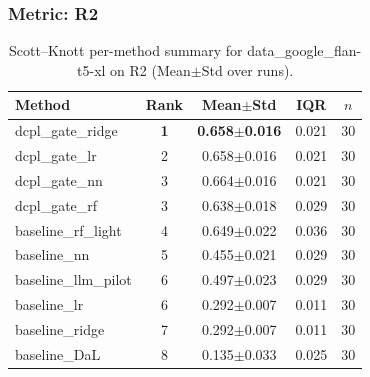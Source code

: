 \subsubsection*{Metric: R2}
\begin{table}[H]
\centering
\scriptsize
\setlength{\tabcolsep}{4pt}
\renewcommand{\arraystretch}{1.1}
\caption{Scott--Knott per-method summary for data\_google\_flan-t5-xl on R2 (Mean$\pm$Std over runs).}
\label{tab:sk_data_google_flan-t5-xl_R2}
\begin{tabular}{l|c|c|c|c}
\hline
\textbf{Method} & \textbf{Rank} & \textbf{Mean$\pm$Std} & \textbf{IQR} & \textbf{$n$} \\
\hline
\rowcolor{red!15} dcpl\_gate\_ridge & \textbf{1} & \textbf{0.658$\pm$0.016} & 0.021 & 30 \\
dcpl\_gate\_lr & 2 & 0.658$\pm$0.016 & 0.021 & 30 \\
dcpl\_gate\_nn & 3 & 0.664$\pm$0.016 & 0.021 & 30 \\
dcpl\_gate\_rf & 3 & 0.638$\pm$0.018 & 0.029 & 30 \\
baseline\_rf\_light & 4 & 0.649$\pm$0.022 & 0.036 & 30 \\
baseline\_nn & 5 & 0.455$\pm$0.021 & 0.029 & 30 \\
baseline\_llm\_pilot & 6 & 0.497$\pm$0.023 & 0.029 & 30 \\
baseline\_lr & 6 & 0.292$\pm$0.007 & 0.011 & 30 \\
baseline\_ridge & 7 & 0.292$\pm$0.007 & 0.011 & 30 \\
baseline\_DaL & 8 & 0.135$\pm$0.033 & 0.025 & 30 \\
\hline
\end{tabular}
\end{table}

